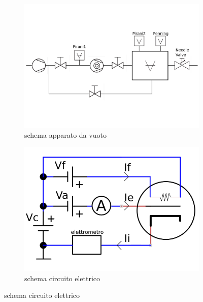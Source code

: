 \documentclass[11pt,a4paper]{article}
\begin{document}
\begin{figure}[!h]
  \begin{subfigure}[b]{0.6\textwidth}
    \includegraphics[width=\textwidth]{vuoto}
    \caption{schema apparato da vuoto} %
    \label{fig:f1}
  \end{subfigure}
  \hfill
  \begin{subfigure}[b]{0.4\textwidth}
    \includegraphics[width=\textwidth]{elettrico}
    \caption{schema circuito elettrico} %
    \label{fig:f2}
  \end{subfigure}
\end{figure}
\end{document}
